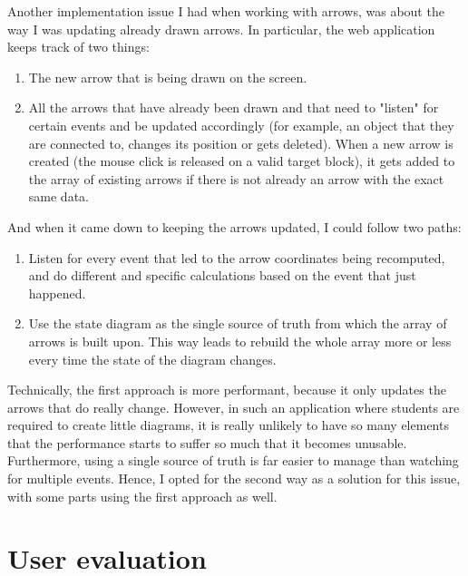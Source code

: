 \documentclass[]{usiinfbachelorproject}
\begin{document}
\noindent Another implementation issue I had when working with arrows, was about the way I was updating already drawn arrows. In particular, the web application keeps track of two things:

\begin{enumerate}
	\item The new arrow that is being drawn on the screen.
	\item All the arrows that have already been drawn and that need to "listen" for certain events and be updated accordingly (for example, an object that they are connected to, changes its position or gets deleted). When a new arrow is created (the mouse click is released on a valid target block), it gets added to the array of existing arrows if there is not already an arrow with the exact same data. 
\end{enumerate}

\noindent And when it came down to keeping the arrows updated, I could follow two paths:

\begin{enumerate}
	\item Listen for every event that led to the arrow coordinates being recomputed, and do different and specific calculations based on the event that just happened.
	\item Use the state diagram as the single source of truth from which the array of arrows is built upon. This way leads to rebuild the whole array more or less every time the state of the diagram changes.
\end{enumerate}

\noindent Technically, the first approach is more performant, because it only updates the arrows that do really change. However, in such an application where students are required to create little diagrams, it is really unlikely to have so many elements that the performance starts to suffer so much that it becomes unusable. Furthermore, using a single source of truth is far easier to manage than watching for multiple events. Hence, I opted for the second way as a solution for this issue, with some parts using the first approach as well.


\vspace{\fill}

\pagebreak

\section{User evaluation} \label{Testing}
\end{document}
